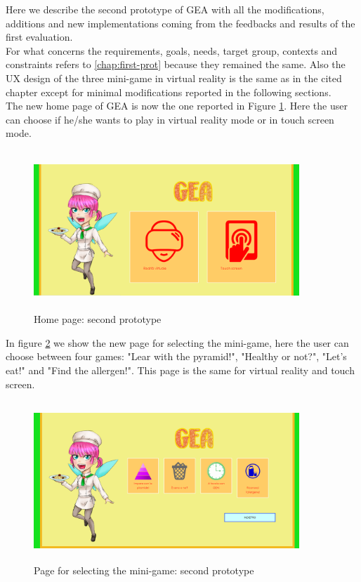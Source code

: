Here we describe the second prototype of GEA with all the modifications, additions and new implementations coming from the feedbacks and results of the first evaluation.\\
For what concerns the requirements, goals, needs, target group, contexts and constraints refers to \autoref{chap:first-prot} because they remained the same. Also the UX design of the three mini-game in virtual reality is the same as in the cited chapter except for minimal modifications reported in the following sections.\\
The new home page of GEA is now the one reported in Figure \ref{fig:newhomepage}. Here the user can choose if he/she wants to play in virtual reality mode or in touch screen mode. \\
\begin{figure}[H]
\centering
\includegraphics[width=10cm, height=6cm]{immagini/homepagenew.png}
\caption{Home page: second prototype}\label{fig:newhomepage}
\end{figure}
In figure \ref{fig:newselection} we show the new page for selecting the mini-game, here the user can choose between four games: "Lear with the pyramid!", "Healthy or not?", "Let's eat!" and "Find the allergen!". This page is the same for virtual reality and touch screen.
\begin{figure}[H]
\centering
\includegraphics[width=10cm, height=6cm]{immagini/selectionnew.png}
\caption{Page for selecting the mini-game: second prototype}\label{fig:newselection}
\end{figure}
